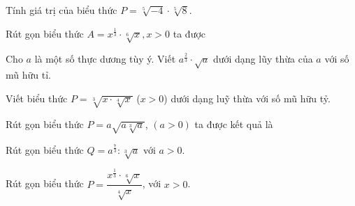 \begin{ex}%
	Tính giá trị của biểu  thức $P=\sqrt[5]{-4}\cdot\sqrt[5]8$.
\end{ex}

\begin{ex}%
	Rút gọn biểu  thức $A=x^{\tfrac{1}{3}}\cdot\sqrt[6]x, x > 0$ ta được
\end{ex}

\begin{ex}%
	Cho $a$ là một  số thực dương tùy ý. Viết $a^{\tfrac{2}{3}}\cdot \sqrt{a}$ dưới dạng lũy thừa của $a$ với số mũ hữu tỉ.
\end{ex}

\begin{ex}%
	Viết biểu thức $P=\sqrt[3]{x\cdot\sqrt[4]x}$ ($x > 0$) dưới dạng luỹ thừa với số  mũ hữu tỷ.
	 \loigiai{
		\[P=\sqrt[3]{x\cdot \sqrt[4]x}=\sqrt[3]{x\cdot x^{\tfrac{1}{4}}}=\left(x^{\tfrac{5}{4}} \right)^{\tfrac{1}{3}}=x^{\tfrac{5}{12}}. 
		\] 
	 }
\end{ex}

\begin{ex}%
	Rút gọn  biểu thức $P=a\sqrt{a\sqrt[3]a}$, $\left(a > 0\right)$ ta được kết quả là
\end{ex}

\begin{ex}%
	Rút gọn biểu thức $Q=a^{\tfrac{7}{3}}:\sqrt[3]a$  với $a > 0$.
\end{ex}

\begin{ex}%
	Rút  gọn biểu thức $P=\dfrac{x^{\tfrac{1}{3}}\cdot \sqrt[6]x}{\sqrt[4]x}$, với $x > 0$.
\end{ex}

